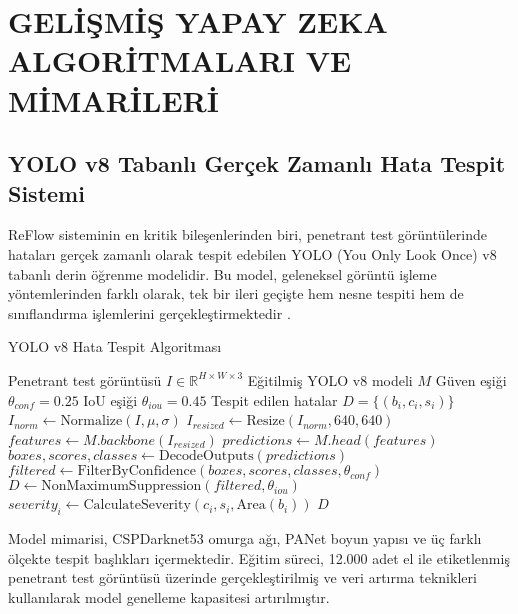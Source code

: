 \documentclass[12pt,a4paper]{article}
\begin{document}
\section{GELİŞMİŞ YAPAY ZEKA ALGORİTMALARI VE MİMARİLERİ}

\subsection{YOLO v8 Tabanlı Gerçek Zamanlı Hata Tespit Sistemi}

ReFlow sisteminin en kritik bileşenlerinden biri, penetrant test görüntülerinde hataları gerçek zamanlı olarak tespit edebilen YOLO (You Only Look Once) v8 tabanlı derin öğrenme modelidir. Bu model, geleneksel görüntü işleme yöntemlerinden farklı olarak, tek bir ileri geçişte hem nesne tespiti hem de sınıflandırma işlemlerini gerçekleştirmektedir \cite{redmon2022yolo}.

\begin{algorithm}[h]
\caption{YOLO v8 Hata Tespit Algoritması}
\begin{algorithmic}[1]
\REQUIRE Penetrant test görüntüsü $I \in \mathbb{R}^{H \times W \times 3}$
\REQUIRE Eğitilmiş YOLO v8 modeli $M$
\REQUIRE Güven eşiği $\theta_{conf} = 0.25$
\REQUIRE IoU eşiği $\theta_{iou} = 0.45$
\ENSURE Tespit edilen hatalar $D = \{(b_i, c_i, s_i)\}$
\STATE $I_{norm} \leftarrow \text{Normalize}(I, \mu, \sigma)$
\STATE $I_{resized} \leftarrow \text{Resize}(I_{norm}, 640, 640)$
\STATE $features \leftarrow M.backbone(I_{resized})$
\STATE $predictions \leftarrow M.head(features)$
\STATE $boxes, scores, classes \leftarrow \text{DecodeOutputs}(predictions)$
\STATE $filtered \leftarrow \text{FilterByConfidence}(boxes, scores, classes, \theta_{conf})$
\STATE $D \leftarrow \text{NonMaximumSuppression}(filtered, \theta_{iou})$
    \STATE $severity_i \leftarrow \text{CalculateSeverity}(c_i, s_i, \text{Area}(b_i))$
\ENDFOR
\RETURN $D$
\end{algorithmic}
\end{algorithm}

Model mimarisi, CSPDarknet53 omurga ağı, PANet boyun yapısı ve üç farklı ölçekte tespit başlıkları içermektedir. Eğitim süreci, 12.000 adet el ile etiketlenmiş penetrant test görüntüsü üzerinde gerçekleştirilmiş ve veri artırma teknikleri kullanılarak model genelleme kapasitesi artırılmıştır.
\end{document}

